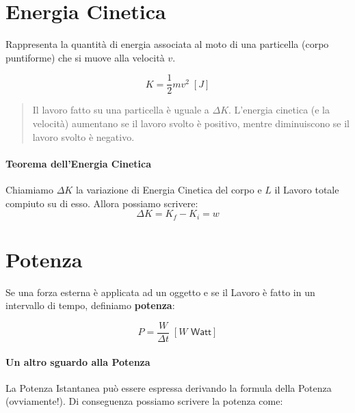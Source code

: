     \section{Energia Cinetica} Rappresenta la quantità di energia associata al 
        moto di una particella (corpo puntiforme) che si muove alla velocità $v$.

        \begin{equation}
            K = \frac{1}{2}mv^2 \; [J]
        \end{equation}

        \begin{quote}
            Il lavoro fatto su una particella è uguale a $\Delta K$. L'energia 
            cinetica (e la velocità) aumentano se il lavoro svolto è positivo, 
            mentre diminuiscono se il lavoro svolto è negativo.
        \end{quote}

        \paragraph{Teorema dell'Energia Cinetica} Chiamiamo $\Delta K$ la 
        variazione di Energia Cinetica del corpo e $L$ il Lavoro totale compiuto
        su di esso. Allora possiamo scrivere:
        \begin{equation}
            \Delta K = K_f - K_i = w
        \end{equation}

    
    \section{Potenza} Se una forza esterna è applicata ad un oggetto e se il 
    Lavoro è fatto in un intervallo di tempo, definiamo \textbf{potenza}:
        
        \begin{equation}
            P = \frac{W}{\Delta t} \; [W \textsf{  Watt}]
        \end{equation}

        \paragraph{Un altro sguardo alla Potenza} La Potenza Istantanea può 
        essere espressa derivando la formula della Potenza (ovviamente!). Di 
        conseguenza possiamo scrivere la potenza come:

